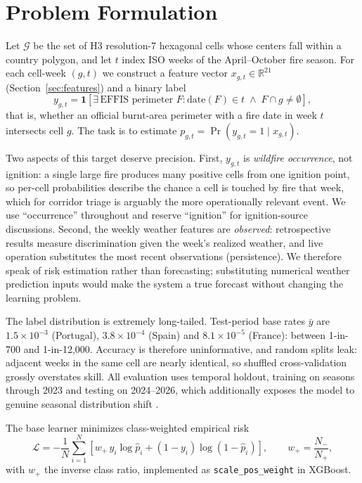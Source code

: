 \documentclass[11pt]{article}
\begin{document}
\section{Problem Formulation}
\label{sec:problem}

Let $\mathcal{G}$ be the set of H3 resolution-7 hexagonal cells
\citep{uber2018h3} whose centers fall within a country polygon, and let
$t$ index ISO weeks of the April--October fire season. For each cell-week
$(g, t)$ we construct a feature vector $x_{g,t} \in \mathbb{R}^{21}$
(Section~\ref{sec:features}) and a binary label
\[
  y_{g,t} = \mathbf{1}\left[\exists\, \text{EFFIS perimeter } F :
  \mathrm{date}(F) \in t \;\wedge\; F \cap g \neq \emptyset\right],
\]
that is, whether an official burnt-area perimeter with a fire date in week $t$
intersects cell $g$. The task is to estimate
$p_{g,t} = \Pr(y_{g,t}=1 \mid x_{g,t})$.

Two aspects of this target deserve precision. First, $y_{g,t}$ is
\emph{wildfire occurrence}, not ignition: a single large fire produces many
positive cells from one ignition point, so per-cell probabilities describe
the chance a cell is touched by fire that week, which for corridor triage is
arguably the more operationally relevant event. We use ``occurrence''
throughout and reserve ``ignition'' for ignition-source discussions. Second,
the weekly weather features are \emph{observed}: retrospective results
measure discrimination given the week's realized weather, and live operation
substitutes the most recent observations (persistence). We therefore speak
of risk estimation rather than forecasting; substituting numerical weather
prediction inputs would make the system a true forecast without changing the
learning problem.

The label distribution is extremely long-tailed. Test-period base rates
$\bar{y}$ are $1.5\times10^{-3}$ (Portugal), $3.8\times10^{-4}$ (Spain) and
$8.1\times10^{-5}$ (France): between 1-in-700 and 1-in-12{,}000. Accuracy is
therefore uninformative, and random splits leak: adjacent weeks in the same
cell are nearly identical, so shuffled cross-validation grossly overstates
skill. All evaluation uses temporal holdout, training on seasons through 2023
and testing on 2024--2026, which additionally exposes the model to genuine
seasonal distribution shift \citep{sugiyama2012covariate,jiang2026eapo}.

The base learner minimizes class-weighted empirical risk
\begin{equation}
  \mathcal{L} = -\frac{1}{N}\sum_{i=1}^{N}
  \left[ w_{+}\, y_i \log \hat{p}_i + (1-y_i)\log(1-\hat{p}_i) \right],
  \qquad w_{+} = \frac{N_{-}}{N_{+}},
  \label{eq:erm}
\end{equation}
with $w_{+}$ the inverse class ratio, implemented as
\texttt{scale\_pos\_weight} in XGBoost.
\end{document}
